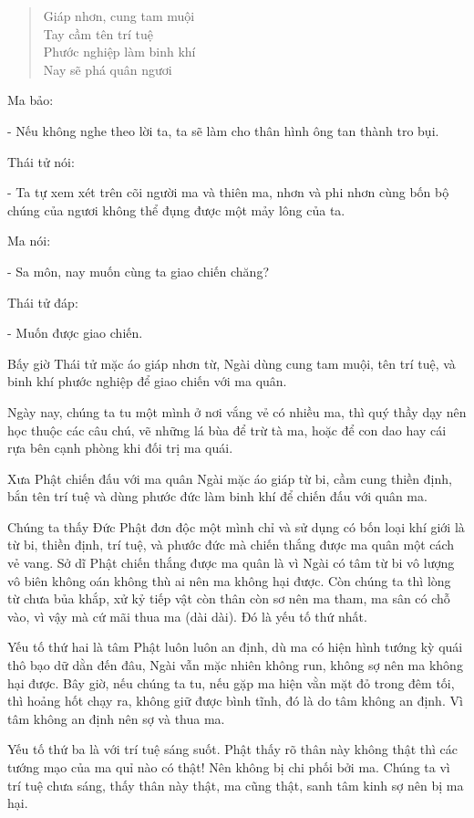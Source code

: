 \documentclass[
  12pt,
  oneside]{book}
\begin{document}
\begin{quote}
Giáp nhơn, cung tam muội\\
Tay cầm tên trí tuệ\\
Phước nghiệp làm binh khí\\
Nay sẽ phá quân ngươi
\end{quote}

Ma bảo:

- Nếu không nghe theo lời ta, ta sẽ làm cho thân hình ông tan thành tro bụi.

Thái tử nói:

- Ta tự xem xét trên cõi người ma và thiên ma, nhơn và phi nhơn cùng bốn bộ chúng của ngươi không thể đụng được một mảy lông của ta.

Ma nói:

- Sa môn, nay muốn cùng ta giao chiến chăng?

Thái tử đáp:

- Muốn được giao chiến.

Bấy giờ Thái tử mặc áo giáp nhơn từ, Ngài dùng cung tam muội, tên trí tuệ, và binh khí phước nghiệp để giao chiến với ma quân.

Ngày nay, chúng ta tu một mình ở nơi vắng vẻ có nhiều ma, thì quý thầy dạy nên học thuộc các câu chú, vẽ những lá bùa để trừ tà ma, hoặc để con dao hay cái rựa bên cạnh phòng khi đối trị ma quái.

Xưa Phật chiến đấu với ma quân Ngài mặc áo giáp từ bi, cầm cung thiền định, bắn tên trí tuệ và dùng phước đức làm binh khí để chiến đấu với quân ma.

Chúng ta thấy Đức Phật đơn độc một mình chỉ và sử dụng có bốn loại khí giới là từ bi, thiền định, trí tuệ, và phước đức mà chiến thắng được ma quân một cách vẻ vang. Sở dĩ Phật chiến thắng được ma quân là vì Ngài có tâm từ bi vô lượng vô biên không oán không thù ai nên ma không hại được. Còn chúng ta thì lòng từ chưa bủa khắp, xử kỷ tiếp vật còn thân còn sơ nên ma tham, ma sân có chỗ vào, vì vậy mà cứ mãi thua ma (dài dài). Đó là yếu tố thứ nhất.

Yếu tố thứ hai là tâm Phật luôn luôn an định, dù ma có hiện hình tướng kỳ quái thô bạo dữ dằn đến đâu, Ngài vẫn mặc nhiên không run, không sợ nên ma không hại được. Bây giờ, nếu chúng ta tu, nếu gặp ma hiện vằn mặt đỏ trong đêm tối, thì hoảng hốt chạy ra, không giữ được bình tĩnh, đó là do tâm không an định. Vì tâm không an định nên sợ và thua ma.

Yếu tố thứ ba là với trí tuệ sáng suốt. Phật thấy rõ thân này không thật thì các tướng mạo của ma quỉ nào có thật! Nên không bị chi phối bởi ma. Chúng ta vì trí tuệ chưa sáng, thấy thân này thật, ma cũng thật, sanh tâm kinh sợ nên bị ma hại.
\end{document}
